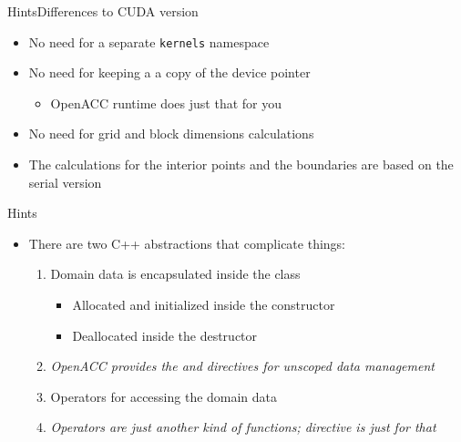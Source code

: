 \documentclass[12pt,aspectratio=169]{beamer}
\begin{document}
\begin{frame}{Hints}{Differences to CUDA version}
  \begin{itemize}
  \item No need for a separate \texttt{kernels} namespace
  \item No need for keeping a a copy of the device pointer
    \begin{itemize}
    \item OpenACC runtime does just that for you
    \end{itemize}
  \item No need for grid and block dimensions calculations
  \item The calculations for the interior points and the boundaries are based
    on the serial version
  \end{itemize}
\end{frame}

\begin{frame}{Hints}
  \begin{itemize}
  \item There are two C++ abstractions that complicate things:
    \vfill
    \begin{enumerate}
    \item Domain data is encapsulated inside the  class
      \begin{itemize}
      \item Allocated and initialized inside the constructor
      \item Deallocated inside the destructor
      \end{itemize}
    \item<2->[Hint:] \emph{OpenACC provides the  and
       directives for unscoped data management}
    \vfill
    \item<3-> Operators for accessing the domain data
    \item<4->[Hint:] \emph{Operators are just another kind of functions;
       directive is just for that}
    \end{enumerate}
  \end{itemize}
\end{frame}
\end{document}
